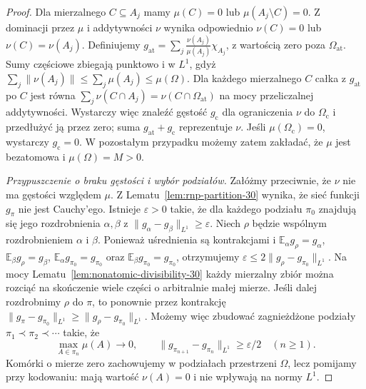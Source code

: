 \begin{proof}
Dla mierzalnego $C\subseteq A_j$ mamy $\mu(C)=0$
lub $\mu(A_j\setminus C)=0$. Z dominacji przez $\mu$
i addytywności $\nu$ wynika odpowiednio $\nu(C)=0$
lub $\nu(C)=\nu(A_j)$. Definiujemy
$g_{\mathrm{at}}=\sum_j\frac{\nu(A_j)}{\mu(A_j)}\chi_{A_j}$,
z wartością zero poza $\Omega_{\mathrm{at}}$.
Sumy częściowe zbiegają punktowo i w $L^1$, gdyż
$\sum_j\|\nu(A_j)\|\le\sum_j\mu(A_j)\le\mu(\Omega)$.
Dla każdego mierzalnego $C$ całka z $g_{\mathrm{at}}$
po $C$ jest równa $\sum_j\nu(C\cap A_j)
=\nu(C\cap\Omega_{\mathrm{at}})$ na mocy przeliczalnej
addytywności. Wystarczy więc znaleźć gęstość
$g_{\mathrm{c}}$ dla ograniczenia $\nu$ do
$\Omega_{\mathrm{c}}$ i przedłużyć ją przez zero;
suma $g_{\mathrm{at}}+g_{\mathrm{c}}$ reprezentuje $\nu$.
Jeśli $\mu(\Omega_{\mathrm{c}})=0$, wystarczy
$g_{\mathrm{c}}=0$. W pozostałym przypadku możemy
zatem zakładać, że $\mu$ jest bezatomowa
i $\mu(\Omega)=M>0$.

\emph{Przypuszczenie o braku gęstości i wybór podziałów.}
Załóżmy przeciwnie, że $\nu$ nie ma gęstości
względem $\mu$. Z Lematu~\ref{lem:rnp-partition-30}
wynika, że sieć funkcji $g_\pi$ nie jest Cauchy'ego.
Istnieje $\varepsilon>0$ takie, że dla każdego
podziału $\pi_0$ znajdują się jego rozdrobnienia
$\alpha,\beta$ z
$\|g_\alpha-g_\beta\|_{L^1}\ge\varepsilon$.
Niech $\rho$ będzie wspólnym rozdrobnieniem
$\alpha$ i $\beta$. Ponieważ uśrednienia są
kontrakcjami i $\mathbb E_\alpha g_\rho=g_\alpha$,
$\mathbb E_\beta g_\rho=g_\beta$,
$\mathbb E_\alpha g_{\pi_0}=g_{\pi_0}$ oraz
$\mathbb E_\beta g_{\pi_0}=g_{\pi_0}$,
otrzymujemy
$\varepsilon\le2\|g_\rho-g_{\pi_0}\|_{L^1}$.
Na mocy Lematu~\ref{lem:nonatomic-divisibility-30}
każdy mierzalny zbiór można rozciąć na skończenie
wiele części o arbitralnie małej mierze. Jeśli dalej rozdrobnimy
$\rho$ do $\pi$, to ponownie przez kontrakcję
$\|g_\pi-g_{\pi_0}\|_{L^1}
\ge\|g_\rho-g_{\pi_0}\|_{L^1}$.
Możemy więc zbudować zagnieżdżone podziały
$\pi_1\prec\pi_2\prec\cdots$ takie, że
\begin{equation}\label{eq:rnp-partition-jumps-30}
 \max_{A\in\pi_n}\mu(A)\longrightarrow0,
 \qquad
 \|g_{\pi_{n+1}}-g_{\pi_n}\|_{L^1}
 \ge\varepsilon/2\quad(n\ge1).
\end{equation}
Komórki o mierze zero zachowujemy w podziałach
przestrzeni $\Omega$, lecz pomijamy przy kodowaniu:
mają wartość $\nu(A)=0$ i nie wpływają na normy $L^1$.


\end{proof}
